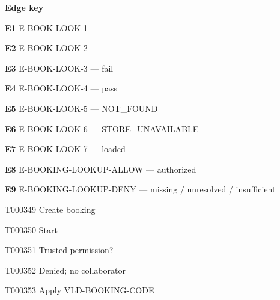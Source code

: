 \documentclass[11pt,a4paper]{article}
\begin{document}
\noindent\textbf{Edge key}\par
\begingroup\small\raggedright\setlength{\parskip}{1pt}
\noindent\textbf{E1} E-BOOK-LOOK-1\par
\noindent\textbf{E2} E-BOOK-LOOK-2\par
\noindent\textbf{E3} E-BOOK-LOOK-3 --- fail\par
\noindent\textbf{E4} E-BOOK-LOOK-4 --- pass\par
\noindent\textbf{E5} E-BOOK-LOOK-5 --- NOT\_FOUND\par
\noindent\textbf{E6} E-BOOK-LOOK-6 --- STORE\_UNAVAILABLE\par
\noindent\textbf{E7} E-BOOK-LOOK-7 --- loaded\par
\noindent\textbf{E8} E-BOOKING-LOOKUP-ALLOW --- authorized\par
\noindent\textbf{E9} E-BOOKING-LOOKUP-DENY --- missing / unresolved / insufficient\par
\endgroup
\clearpage
\begin{atlastext}{T000349}
Create booking
\end{atlastext}
\begin{atlastext}{T000350}
Start
\end{atlastext}
\begin{atlastext}{T000351}
Trusted permission?
\end{atlastext}
\begin{atlastext}{T000352}
Denied; no collaborator
\end{atlastext}
\begin{atlastext}{T000353}
Apply VLD-BOOKING-CODE
\end{atlastext}
\end{document}
